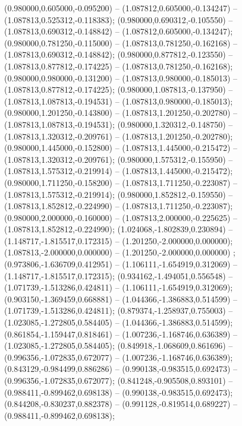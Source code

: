  (0.980000,0.605000,-0.095200) -- (1.087812,0.605000,-0.134247) -- (1.087813,0.525312,-0.118383);
 (0.980000,0.690312,-0.105550) -- (1.087813,0.690312,-0.148842) -- (1.087812,0.605000,-0.134247);
 (0.980000,0.781250,-0.115000) -- (1.087813,0.781250,-0.162168) -- (1.087813,0.690312,-0.148842);
 (0.980000,0.877812,-0.123550) -- (1.087813,0.877812,-0.174225) -- (1.087813,0.781250,-0.162168);
 (0.980000,0.980000,-0.131200) -- (1.087813,0.980000,-0.185013) -- (1.087813,0.877812,-0.174225);
 (0.980000,1.087813,-0.137950) -- (1.087813,1.087813,-0.194531) -- (1.087813,0.980000,-0.185013);
 (0.980000,1.201250,-0.143800) -- (1.087813,1.201250,-0.202780) -- (1.087813,1.087813,-0.194531);
 (0.980000,1.320312,-0.148750) -- (1.087813,1.320312,-0.209761) -- (1.087813,1.201250,-0.202780);
 (0.980000,1.445000,-0.152800) -- (1.087813,1.445000,-0.215472) -- (1.087813,1.320312,-0.209761);
 (0.980000,1.575312,-0.155950) -- (1.087813,1.575312,-0.219914) -- (1.087813,1.445000,-0.215472);
 (0.980000,1.711250,-0.158200) -- (1.087813,1.711250,-0.223087) -- (1.087813,1.575312,-0.219914);
 (0.980000,1.852812,-0.159550) -- (1.087813,1.852812,-0.224990) -- (1.087813,1.711250,-0.223087);
 (0.980000,2.000000,-0.160000) -- (1.087813,2.000000,-0.225625) -- (1.087813,1.852812,-0.224990);
 (1.024068,-1.802839,0.230894) -- (1.148717,-1.815517,0.172315) -- (1.201250,-2.000000,0.000000);
 (1.087813,-2.000000,0.000000) -- (1.201250,-2.000000,0.000000) ;
 (0.973806,-1.636709,0.412951) -- (1.106111,-1.654919,0.312069) -- (1.148717,-1.815517,0.172315);
 (0.934162,-1.494051,0.556548) -- (1.071739,-1.513286,0.424811) -- (1.106111,-1.654919,0.312069);
 (0.903150,-1.369459,0.668881) -- (1.044366,-1.386883,0.514599) -- (1.071739,-1.513286,0.424811);
 (0.879374,-1.258937,0.755003) -- (1.023085,-1.272805,0.584405) -- (1.044366,-1.386883,0.514599);
 (0.861854,-1.159447,0.818461) -- (1.007236,-1.168746,0.636389) -- (1.023085,-1.272805,0.584405);
 (0.849918,-1.068609,0.861696) -- (0.996356,-1.072835,0.672077) -- (1.007236,-1.168746,0.636389);
 (0.843129,-0.984499,0.886286) -- (0.990138,-0.983515,0.692473) -- (0.996356,-1.072835,0.672077);
 (0.841248,-0.905508,0.893101) -- (0.988411,-0.899462,0.698138) -- (0.990138,-0.983515,0.692473);
 (0.844208,-0.830237,0.882378) -- (0.991128,-0.819514,0.689227) -- (0.988411,-0.899462,0.698138);
